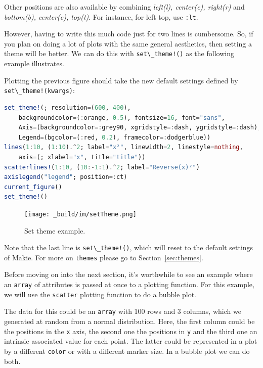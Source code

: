 \documentclass[
  notoc %
]{tufte-book}
\newcommand{\passthrough}[1]{#1}
\begin{document}
Other positions are also available by combining \emph{left(l),
center(c), right(r)} and \emph{bottom(b), center(c), top(t)}. For
instance, for left top, use \passthrough{\lstinline!:lt!}.

However, having to write this much code just for two lines is
cumbersome. So, if you plan on doing a lot of plots with the same
general aesthetics, then setting a theme will be better. We can do this
with \passthrough{\lstinline"set\_theme!()"} as the following example
illustrates.

Plotting the previous figure should take the new default settings
defined by \passthrough{\lstinline"set\_theme!(kwargs)"}:

\begin{lstlisting}[language=Julia]
set_theme!(; resolution=(600, 400),
    backgroundcolor=(:orange, 0.5), fontsize=16, font="sans",
    Axis=(backgroundcolor=:grey90, xgridstyle=:dash, ygridstyle=:dash),
    Legend=(bgcolor=(:red, 0.2), framecolor=:dodgerblue))
lines(1:10, (1:10).^2; label="x²", linewidth=2, linestyle=nothing,
    axis=(; xlabel="x", title="title"))
scatterlines!(1:10, (10:-1:1).^2; label="Reverse(x)²")
axislegend("legend"; position=:ct)
current_figure()
set_theme!()
\end{lstlisting}

\begin{figure}
\hypertarget{fig:setTheme}{%
\centering
\texttt{[image: \_build/im/setTheme.png]}
\caption{Set theme example.}\label{fig:setTheme}
}
\end{figure}

Note that the last line is \passthrough{\lstinline"set\_theme!()"},
which will reset to the default settings of Makie. For more on
\passthrough{\lstinline!themes!} please go to Section~\ref{sec:themes}.

Before moving on into the next section, it's worthwhile to see an
example where an \passthrough{\lstinline!array!} of attributes is passed
at once to a plotting function. For this example, we will use the
\passthrough{\lstinline!scatter!} plotting function to do a bubble plot.

The data for this could be an \passthrough{\lstinline!array!} with 100
rows and 3 columns, which we generated at random from a normal
distribution. Here, the first column could be the positions in the
\passthrough{\lstinline!x!} axis, the second one the positions in
\passthrough{\lstinline!y!} and the third one an intrinsic associated
value for each point. The latter could be represented in a plot by a
different \passthrough{\lstinline!color!} or with a different marker
size. In a bubble plot we can do both.
\end{document}
